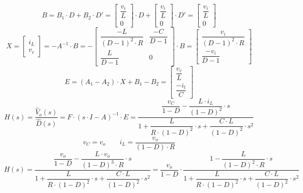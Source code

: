 \documentclass[a4paper,11pt,fleqn]{article}
\begin{document}
\[ B = B_1 \cdot D + B_2 \cdot D'
     = \begin{bmatrix}
            \dfrac{v_i}{L} \\
            0
        \end{bmatrix}
     \cdot D 
     + \begin{bmatrix}
            \dfrac{v_i}{L} \\
            0
        \end{bmatrix}
     \cdot D'
     = \begin{bmatrix}
            \dfrac{v_i}{L} \\
            0
        \end{bmatrix}
\]
\[ X = \begin{bmatrix}i_L\\v_c\end{bmatrix} = -A^{-1} \cdot B 
     = -\begin{bmatrix}
            \dfrac{-L}{(D - 1)^2 \cdot R} & \dfrac{-C}{D - 1} \\
            \dfrac{L}{D-1} & 0
        \end{bmatrix} \cdot B
     = \begin{bmatrix}
            \dfrac{v_i}{(D - 1)^2 \cdot R} \\
            \dfrac{-v_i}{D-1}
        \end{bmatrix}
\]
\[ E = (A_1 - A_2) \cdot X + B_1 - B_2
     = \begin{bmatrix}
            \dfrac{v_c}{L} \\
            \dfrac{-i_l}{C}
        \end{bmatrix}
\]
\[ H(s) = \dfrac{\hat{V}_o(s)}{\hat{D}(s)} = F \cdot (s \cdot I - A)^{-1} \cdot E
    = \dfrac{\dfrac{v_C}{1 - D} - \dfrac{L \cdot i_L}{(1 - D)^2} \cdot s}
        {1 + \dfrac{L}{R \cdot (1 - D)^2} \cdot s + \dfrac{C \cdot L}{(1 - D)^2} \cdot s^2}
\]
\[ v_C = v_o \qquad i_L = \dfrac{v_o}{(1 - D) \cdot R} \]
\[ H(s) = \dfrac{\dfrac{v_o}{1 - D} - \dfrac{L \cdot v_o}{(1 - D)^3 \cdot R} \cdot s}
        {1 + \dfrac{L}{R \cdot (1 - D)^2} \cdot s + \dfrac{C \cdot L}{(1 - D)^2} \cdot s^2}
    = \dfrac{v_o}{1 - D} \cdot \dfrac{1 - \dfrac{L}{(1 - D)^2 \cdot R} \cdot s}
        {1 + \dfrac{L}{R \cdot (1 - D)^2} \cdot s + \dfrac{C \cdot L}{(1 - D)^2} \cdot s^2}
\]
\end{document}
